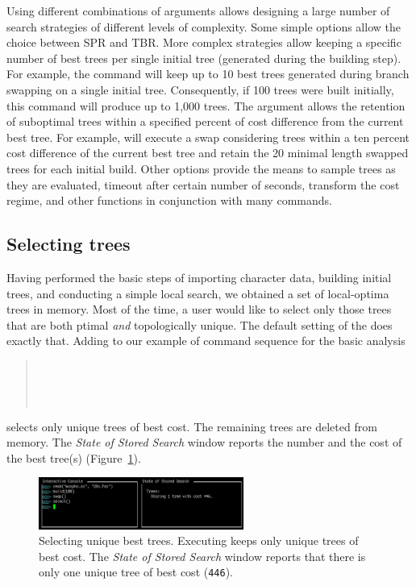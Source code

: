 {Using different combinations of  arguments allows designing a  large number of search strategies of different levels of complexity. Some simple options allow the choice between SPR and TBR. More complex strategies allow keeping a specific number of best trees per single initial tree (generated during the building step). For example, the command  will keep up to 10 best trees generated during branch swapping on a single initial tree. Consequently, if 100 trees were built initially, this command will produce up to 1,000 trees. The argument  allows the retention of suboptimal trees within a specified percent of cost difference from the current best tree. For example,  will execute a swap considering trees within a ten percent cost difference of the current best tree and retain the 20 minimal length swapped trees for each initial build. Other options provide the means to sample trees as they are evaluated, timeout after certain number of seconds, transform the cost regime, and other functions in conjunction with many \poy commands.

\subsection{Selecting trees}

Having performed the basic steps of importing character data, building initial trees, and conducting a simple local search, we obtained a set of local-optima trees in memory. Most of the time, a user would like to select only those trees that are both ptimal \emph{and} topologically unique. The default setting of the  does exactly that. Adding  to our example of command sequence for the basic analysis 
\begin{quote}
 	\\
 	\\
	\\
\end{quote}
selects only unique trees of best cost. The remaining trees are deleted from memory. The \emph{State of Stored Search} window reports the number and the cost of the best tree(s) (Figure~\ref{fig:select}).

\begin{figure}[]
    \begin{center}
        \includegraphics[width=0.6\textwidth]{doc/figures/select.jpg}
    \end{center}
    \caption{Selecting unique best trees. Executing  keeps only unique trees of best cost. The \emph{State of Stored Search} window reports that there is only one unique tree of best cost (\texttt{446}).}
    \label{fig:select}
\end{figure}

}
